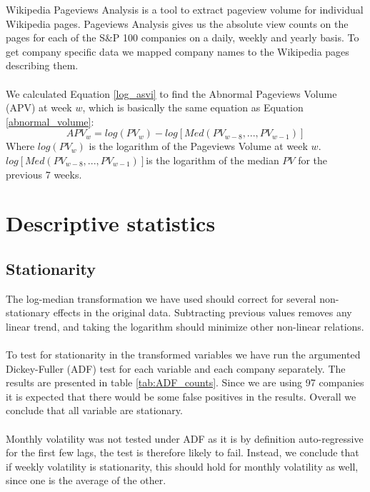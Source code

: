 Wikipedia Pageviews Analysis is a tool to extract pageview volume for individual Wikipedia pages. Pageviews Analysis gives us the absolute view counts on the pages for each of the S\&P 100 companies on a daily, weekly and yearly basis. To get company specific data we mapped company names to the Wikipedia pages describing them.
\\\\
We calculated Equation \eqref{log_asvi} to find the Abnormal Pageviews Volume (APV) at week $w$, which is basically the same equation as Equation \eqref{abnormal_volume}:
\begin{equation}
   \label{abnormal_pageviews_volume} 
   APV_{w} = log(PV_{w}) - log[Med(PV_{w-8},...,PV_{w-1})] 
\end{equation}
   Where $log(PV_{w})$ is the logarithm of the Pageviews Volume at week $w$. $log[Med(PV_{w-8},...,PV_{w-1})]$is the logarithm of the median $PV$ for the previous 7 weeks.


\section{Descriptive statistics}

\subsection{Stationarity}
The log-median transformation we have used should correct for several non-stationary effects in the original data. 
Subtracting previous values removes any linear trend, and taking the logarithm should minimize other non-linear relations. 
\\\\
To test for stationarity in the transformed variables we have run the argumented Dickey-Fuller (ADF) test for each variable and each company separately. The results are presented in table \ref{tab:ADF_counts}. Since we are using 97 companies it is expected that there would be some false positives in the results. Overall we conclude that all variable are stationary. 
\\\\
Monthly volatility was not tested under ADF as it is by definition auto-regressive for the first few lags, the test is therefore likely to fail. Instead, we conclude that if weekly volatility is stationarity, this should hold for monthly volatility as well, since one is the average of the other.

